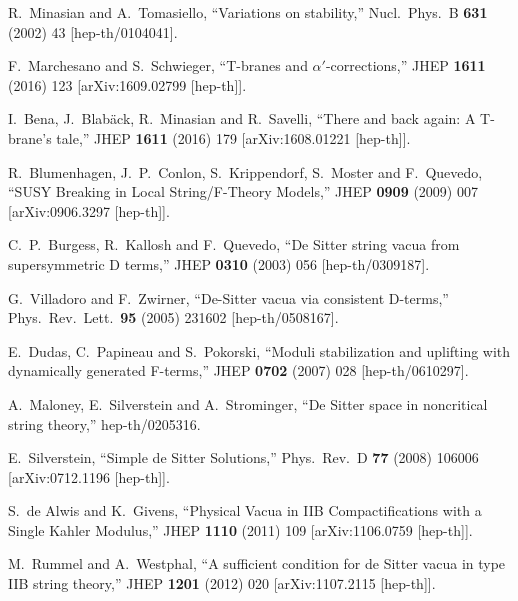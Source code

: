 \documentclass[11pt,a4paper]{article}
\begin{document}
\begin{itemize}
\begin{thebibliography}{99}
  R.~Minasian and A.~Tomasiello,
  ``Variations on stability,''
  Nucl.\ Phys.\ B {\bf 631} (2002) 43
  [hep-th/0104041].

  F.~Marchesano and S.~Schwieger,
  ``T-branes and $\alpha'$-corrections,''
  JHEP {\bf 1611} (2016) 123
  [arXiv:1609.02799 [hep-th]].

  I.~Bena, J.~Blab\"ack, R.~Minasian and R.~Savelli,
  ``There and back again: A T-brane's tale,''
  JHEP {\bf 1611} (2016) 179
  [arXiv:1608.01221 [hep-th]].

  R.~Blumenhagen, J.~P.~Conlon, S.~Krippendorf, S.~Moster and F.~Quevedo,
  ``SUSY Breaking in Local String/F-Theory Models,''
  JHEP {\bf 0909} (2009) 007
  [arXiv:0906.3297 [hep-th]].

  C.~P.~Burgess, R.~Kallosh and F.~Quevedo,
  ``De Sitter string vacua from supersymmetric D terms,''
  JHEP {\bf 0310} (2003) 056
  [hep-th/0309187].

  G.~Villadoro and F.~Zwirner,
  ``De-Sitter vacua via consistent D-terms,''
  Phys.\ Rev.\ Lett.\  {\bf 95} (2005) 231602
  [hep-th/0508167].

  E.~Dudas, C.~Papineau and S.~Pokorski,
  ``Moduli stabilization and uplifting with dynamically generated F-terms,''
  JHEP {\bf 0702} (2007) 028
  [hep-th/0610297].

  A.~Maloney, E.~Silverstein and A.~Strominger,
  ``De Sitter space in noncritical string theory,''
  hep-th/0205316.

  E.~Silverstein,
  ``Simple de Sitter Solutions,''
  Phys.\ Rev.\ D {\bf 77} (2008) 106006
  [arXiv:0712.1196 [hep-th]].


  S.~de Alwis and K.~Givens,
  ``Physical Vacua in IIB Compactifications with a Single Kahler Modulus,''
  JHEP {\bf 1110} (2011) 109
  [arXiv:1106.0759 [hep-th]].
  
  M.~Rummel and A.~Westphal,
  ``A sufficient condition for de Sitter vacua in type IIB string theory,''
  JHEP {\bf 1201} (2012) 020
  [arXiv:1107.2115 [hep-th]].
 

\end{thebibliography}
\end{itemize}
\end{document}
